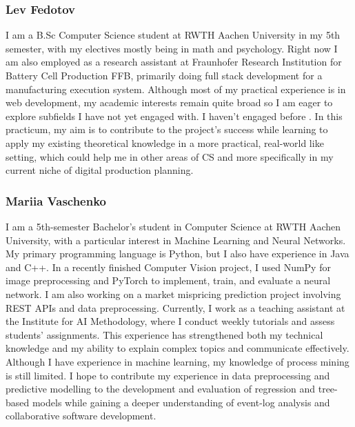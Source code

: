 \documentclass[12pt]{article}
\begin{document}
\subsubsection{Lev Fedotov}
I am a B.Sc Computer Science student at RWTH Aachen University in my 5th semester, with my electives mostly being in math and psychology. Right now I am also employed as a research assistant at Fraunhofer Research Institution for Battery Cell Production FFB, primarily doing full stack development for a manufacturing execution system. Although most of my practical experience is in web development, my academic interests remain quite broad so I am eager to explore subfields I have not yet engaged with. I haven't engaged before  . In this practicum, my aim is to contribute to the project’s success while learning to apply my existing theoretical knowledge in a more practical, real-world like setting, which could help me in other areas of CS and more specifically in my current niche of digital production planning.

\subsubsection{Mariia Vaschenko}
I am a 5th-semester Bachelor's student in Computer Science at RWTH Aachen University, with a particular interest in Machine Learning and Neural Networks. My primary programming language is Python, but I also have experience in Java and C++. In a recently finished Computer Vision project, I used NumPy for image preprocessing and PyTorch to implement, train, and evaluate a neural network. I am also working on a market mispricing prediction project involving REST APIs and data preprocessing.
Currently, I work as a teaching assistant at the Institute for AI Methodology, where I conduct weekly tutorials and assess students' assignments. This experience has strengthened both my technical knowledge and my ability to explain complex topics and communicate effectively.
Although I have experience in machine learning, my knowledge of process mining is still limited. I hope to contribute my experience in data preprocessing and predictive modelling to the development and evaluation of regression and tree-based models while gaining a deeper understanding of event-log analysis and collaborative software development.
\end{document}
